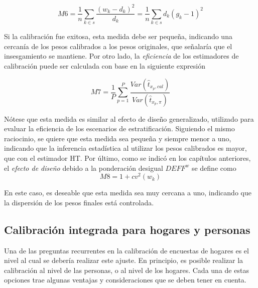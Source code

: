 \documentclass[
  12pt,
  spanish,
]{book}
\begin{document}
\[
M6 = \frac{1}{n}\sum_{k \in s} \frac{(w_k - d_k)^2}{d_k}
= \frac{1}{n}\sum_{k \in s} d_k(g_k - 1)^2
\]

Si la calibración fue exitosa, esta medida debe ser pequeña, indicando una cercanía de los pesos calibrados a los pesos originales, que señalaría que el insesgamiento se mantiene. Por otro lado, la \emph{eficiencia} de los estimadores de calibración puede ser calculada con base en la siguiente expresión

\[
M7 = \frac{1}{P}\sum_{p=1}^P \frac{Var(\hat{t}_{x_p, cal})}{Var(\hat{t}_{x_p, \pi})} 
\]

Nótese que esta medida es similar al efecto de diseño generalizado, utilizado para evaluar la eficiencia de los escenarios de estratificación. Siguiendo el mismo raciocinio, se quiere que esta medida sea pequeña y siempre menor a uno, indicando que la inferencia estadística al utilizar los pesos calibrados es mayor, que con el estimador HT. Por último, como se indicó en los capítulos anteriores, el \emph{efecto de diseño} debido a la ponderación desigual \(DEFF^w\) se define como
\[
M8 = 1+cv^2(w_k)
\]

En este caso, es deseable que esta medida sea muy cercana a uno, indicando que la dispersión de los pesos finales está controlada.

\hypertarget{calibraciuxf3n-integrada-para-hogares-y-personas}{%
\subsection{Calibración integrada para hogares y personas}\label{calibraciuxf3n-integrada-para-hogares-y-personas}}

Una de las preguntas recurrentes en la calibración de encuestas de hogares es el nivel al cual se debería realizar este ajuste. En principio, es posible realizar la calibración al nivel de las personas, o al nivel de los hogares. Cada una de estas opciones trae algunas ventajas y consideraciones que se deben tener en cuenta.
\end{document}
